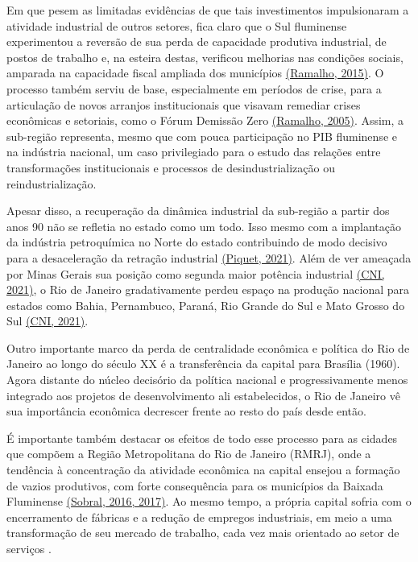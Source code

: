 Em que pesem as limitadas evidências de que tais investimentos
impulsionaram a atividade industrial de outros setores, fica claro que o
Sul fluminense experimentou a reversão de sua perda de capacidade
produtiva industrial, de postos de trabalho e, na esteira destas,
verificou melhorias nas condições sociais, amparada na capacidade fiscal
ampliada dos municípios
\href{https://www.zotero.org/google-docs/?YKljwf}{(Ramalho, 2015)}. O
processo também serviu de base, especialmente em períodos de crise, para
a articulação de novos arranjos institucionais que visavam remediar
crises econômicas e setoriais, como o Fórum Demissão Zero
\href{https://www.zotero.org/google-docs/?kzIW7G}{(Ramalho, 2005)}.
Assim, a sub-região representa, mesmo que com pouca participação no PIB
fluminense e na indústria nacional, um caso privilegiado para o estudo
das relações entre transformações institucionais e processos de
desindustrialização ou reindustrialização.

Apesar disso, a recuperação da dinâmica industrial da sub-região a
partir dos anos 90 não se refletia no estado como um todo. Isso mesmo
com a implantação da indústria petroquímica no Norte do estado
contribuindo de modo decisivo para a desaceleração da retração
industrial \href{https://www.zotero.org/google-docs/?xIxk42}{(Piquet,
2021)}. Além de ver ameaçada por Minas Gerais sua posição como segunda
maior potência industrial
\href{https://www.zotero.org/google-docs/?uC5UHk}{(CNI, 2021)}, o Rio de
Janeiro gradativamente perdeu espaço na produção nacional para estados
como Bahia, Pernambuco, Paraná, Rio Grande do Sul e Mato Grosso do Sul
\href{https://www.zotero.org/google-docs/?TtN18w}{(CNI, 2021)}.

Outro importante marco da perda de centralidade econômica e política do
Rio de Janeiro ao longo do século XX é a transferência da capital para
Brasília (1960). Agora distante do núcleo decisório da política nacional
e progressivamente menos integrado aos projetos de desenvolvimento ali
estabelecidos, o Rio de Janeiro vê sua importância econômica decrescer
frente ao resto do país desde então.

É importante também destacar os efeitos de todo esse processo para as
cidades que compõem a Região Metropolitana do Rio de Janeiro (RMRJ),
onde a tendência à concentração da atividade econômica na capital
ensejou a formação de vazios produtivos, com forte consequência para os
municípios da Baixada Fluminense
\href{https://www.zotero.org/google-docs/?cXsZIX}{(Sobral, 2016, 2017)}.
Ao mesmo tempo, a própria capital sofria com o encerramento de fábricas
e a redução de empregos industriais, em meio a uma transformação de seu
mercado de trabalho, cada vez mais orientado ao setor de serviços .


